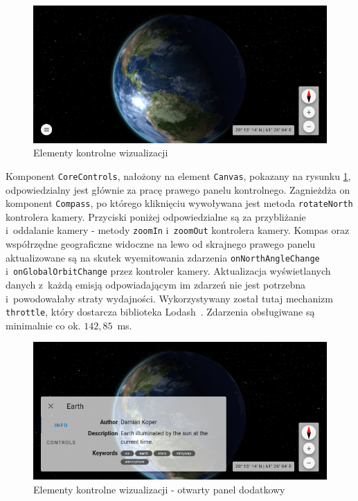 \begin{figure}
    \centering
    \includegraphics[width=\linewidth]{img/c3_controls.png}
    \caption{Elementy kontrolne wizualizacji}
    \label{fig:c3_controls}
\end{figure}


Komponent \texttt{CoreControls}, nałożony na element \texttt{Canvas}, pokazany na rysunku \ref{fig:c3_controls}, odpowiedzialny jest głównie za pracę prawego panelu kontrolnego. Zagnieżdża on komponent \texttt{Compass}, po którego kliknięciu wywoływana jest metoda \texttt{rotateNorth} kontrolera kamery. Przyciski poniżej odpowiedzialne są za przybliżanie i~oddalanie kamery - metody \texttt{zoomIn} i~\texttt{zoomOut} kontrolera kamery. Kompas oraz współrzędne geograficzne widoczne na lewo od skrajnego prawego panelu aktualizowane są na skutek wyemitowania zdarzenia \texttt{onNorthAngleChange} i~\texttt{onGlobalOrbitChange} przez kontroler kamery. Aktualizacja wyświetlanych danych z~każdą emisją odpowiadającym im zdarzeń nie jest potrzebna i~powodowałaby straty wydajności. Wykorzystywany został tutaj mechanizm \texttt{throttle}, który dostarcza biblioteka Lodash~\cite{lodash}. Zdarzenia obsługiwane są minimalnie co ok. $142,85$~ms.
\begin{figure}
    \centering
    \includegraphics[width=\linewidth]{img/c3_controls_open.png}
    \caption{Elementy kontrolne wizualizacji - otwarty panel dodatkowy}
    \label{fig:c3_controls_open}
\end{figure}


